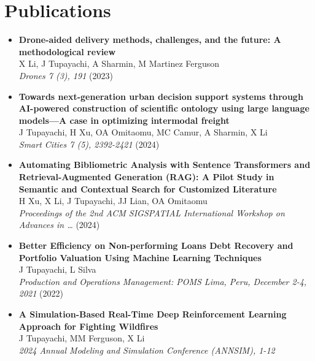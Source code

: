 \documentclass[10pt, letterpaper]{article}
\begin{document}
    \section*{Publications}
\small
    \begin{itemize}[left=0pt] %
        \item \textbf{Drone-aided delivery methods, challenges, and the future: A methodological review} \\
        X Li, J Tupayachi, A Sharmin, M Martinez Ferguson \\
        \textit{Drones 7 (3), 191} (2023) \\
    
        \item \textbf{Towards next-generation urban decision support systems through AI-powered construction of scientific ontology using large language models—A case in optimizing intermodal freight} \\
        J Tupayachi, H Xu, OA Omitaomu, MC Camur, A Sharmin, X Li \\
        \textit{Smart Cities 7 (5), 2392-2421} (2024) \\
    
        \item \textbf{Automating Bibliometric Analysis with Sentence Transformers and Retrieval-Augmented Generation (RAG): A Pilot Study in Semantic and Contextual Search for Customized Literature} \\
        H Xu, X Li, J Tupayachi, JJ Lian, OA Omitaomu \\
        \textit{Proceedings of the 2nd ACM SIGSPATIAL International Workshop on Advances in …} (2024) \\
    
        \item \textbf{Better Efficiency on Non-performing Loans Debt Recovery and Portfolio Valuation Using Machine Learning Techniques} \\
        J Tupayachi, L Silva \\
        \textit{Production and Operations Management: POMS Lima, Peru, December 2-4, 2021} (2022) \\
    
    
        \item \textbf{A Simulation-Based Real-Time Deep Reinforcement Learning Approach for Fighting Wildfires} \\
        J Tupayachi, MM Ferguson, X Li \\
        \textit{2024 Annual Modeling and Simulation Conference (ANNSIM), 1-12} \\
    \end{itemize}
    
\end{document}
